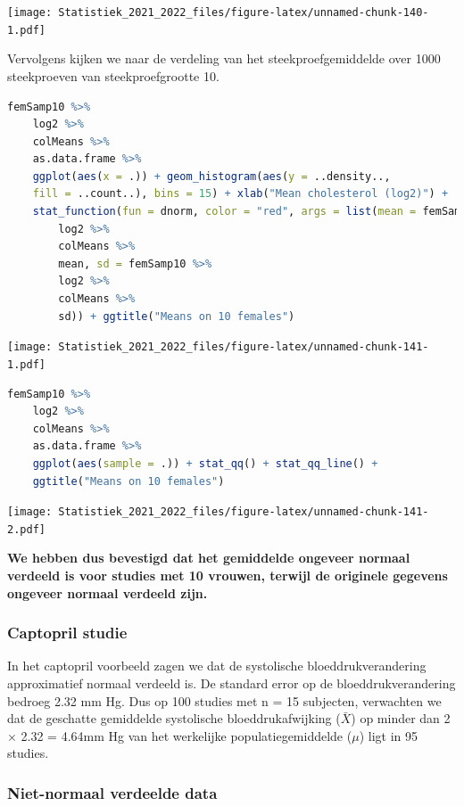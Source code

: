 \documentclass[
  12pt,dutch,coursenotes]{book}
\theoremstyle{definition}
\theoremstyle{definition}
\theoremstyle{definition}
\theoremstyle{definition}
\theoremstyle{remark}
\begin{document}
\texttt{[image: Statistiek\_2021\_2022\_files/figure-latex/unnamed-chunk-140-1.pdf]}

Vervolgens kijken we naar de verdeling van het steekproefgemiddelde over 1000 steekproeven van steekproefgrootte 10.

\begin{lstlisting}[language=R]
femSamp10 %>%
    log2 %>%
    colMeans %>%
    as.data.frame %>%
    ggplot(aes(x = .)) + geom_histogram(aes(y = ..density..,
    fill = ..count..), bins = 15) + xlab("Mean cholesterol (log2)") +
    stat_function(fun = dnorm, color = "red", args = list(mean = femSamp10 %>%
        log2 %>%
        colMeans %>%
        mean, sd = femSamp10 %>%
        log2 %>%
        colMeans %>%
        sd)) + ggtitle("Means on 10 females")
\end{lstlisting}

\texttt{[image: Statistiek\_2021\_2022\_files/figure-latex/unnamed-chunk-141-1.pdf]}

\begin{lstlisting}[language=R]
femSamp10 %>%
    log2 %>%
    colMeans %>%
    as.data.frame %>%
    ggplot(aes(sample = .)) + stat_qq() + stat_qq_line() +
    ggtitle("Means on 10 females")
\end{lstlisting}

\texttt{[image: Statistiek\_2021\_2022\_files/figure-latex/unnamed-chunk-141-2.pdf]}

\textbf{We hebben dus bevestigd dat het gemiddelde ongeveer normaal verdeeld is voor studies met 10 vrouwen, terwijl de originele gegevens ongeveer normaal verdeeld zijn.}

\hypertarget{captopril-studie}{%
\subsubsection{Captopril studie}\label{captopril-studie}}

In het captopril voorbeeld zagen we dat de systolische bloeddrukverandering approximatief normaal verdeeld is.
De standard error op de bloeddrukverandering bedroeg 2.32 mm Hg.
Dus op 100 studies met n = 15 subjecten, verwachten we dat de geschatte gemiddelde systolische bloeddrukafwijking (\(\bar X\)) op minder dan 2 × 2.32 = 4.64mm Hg van het werkelijke populatiegemiddelde (\(\mu\)) ligt in 95 studies.

\hypertarget{niet-normaal-verdeelde-data}{%
\subsubsection{Niet-normaal verdeelde data}\label{niet-normaal-verdeelde-data}}
\end{document}
